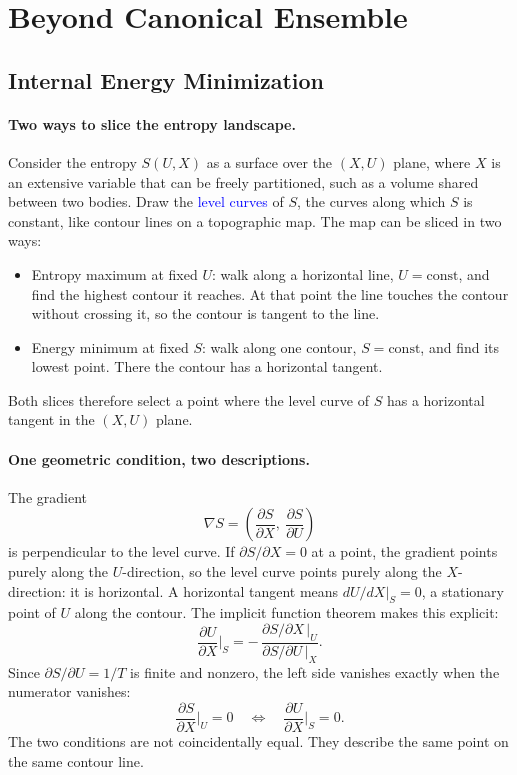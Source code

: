 \section{Beyond Canonical Ensemble}

\subsection{Internal Energy Minimization}

\paragraph{Two ways to slice the entropy landscape.}
Consider the entropy $S(U,X)$ as a surface over the $(X,U)$ plane, where $X$
is an extensive variable that can be freely partitioned, such as a volume
shared between two bodies. Draw the \textcolor{blue}{level curves} of $S$,
the curves along which $S$ is constant, like contour lines on a topographic
map. The map can be sliced in two ways:
\begin{itemize}
    \item Entropy maximum at fixed $U$: walk along a horizontal line,
    $U=\text{const}$, and find the highest contour it reaches. At that point
    the line touches the contour without crossing it, so the contour is
    tangent to the line.
    \item Energy minimum at fixed $S$: walk along one contour,
    $S=\text{const}$, and find its lowest point. There the contour has a
    horizontal tangent.
\end{itemize}
Both slices therefore select a point where the level curve of $S$ has a
horizontal tangent in the $(X,U)$ plane.

\paragraph{One geometric condition, two descriptions.}
The gradient
\begin{equation*}
    \nabla S = \left(\frac{\partial S}{\partial X},\
    \frac{\partial S}{\partial U}\right)
\end{equation*}
is perpendicular to the level curve. If $\partial S/\partial X=0$ at a point,
the gradient points purely along the $U$-direction, so the level curve points
purely along the $X$-direction: it is horizontal. A horizontal tangent means
$dU/dX|_S=0$, a stationary point of $U$ along the contour. The implicit
function theorem makes this explicit:
\begin{equation}
    \boxed{\frac{\partial U}{\partial X}\bigg|_S
    = -\,\frac{\partial S/\partial X\,|_U}{\partial S/\partial U\,|_X}.}
\end{equation}
Since $\partial S/\partial U=1/T$ is finite and nonzero, the left side
vanishes exactly when the numerator vanishes:
\begin{equation}
    \boxed{\frac{\partial S}{\partial X}\bigg|_U=0
    \quad\Longleftrightarrow\quad
    \frac{\partial U}{\partial X}\bigg|_S=0.}
\end{equation}
The two conditions are not coincidentally equal. They describe the same
point on the same contour line.

